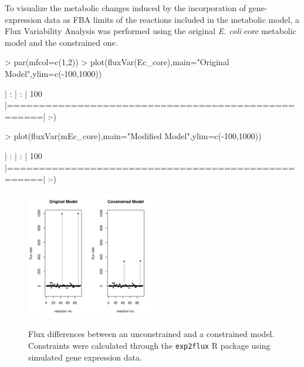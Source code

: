 To visualize the metabolic changes induced by the incorporation of gene-expression data as FBA limits of the reactions included in the metabolic model, a Flux Variability Analysis was performed using the original \textit{E. coli} core metabolic model and the constrained one.
\begin{Schunk}
\begin{Sinput}
> par(mfcol=c(1,2))
> plot(fluxVar(Ec_core),main="Original Model",ylim=c(-100,1000))
\end{Sinput}
\begin{Soutput}
|            :            |            :            | 100 %
|===================================================| :-) 
\end{Soutput}
\begin{Sinput}
> plot(fluxVar(mEc_core),main="Modified Model",ylim=c(-100,1000))
\end{Sinput}
\begin{Soutput}
|            :            |            :            | 100 %
|===================================================| :-) 
\end{Soutput}
\end{Schunk}
\begin{figure}[h]
\begin{center}
\includegraphics[width=0.5\textwidth]{exp2flux/exp2flux-001}\\
\caption{Flux differences between an unconstrained and a constrained model. Constraints were calculated through the \texttt{exp2flux} R package using simulated gene expression data.}
\label{exp2fluxFlux}
\end{center}
\end{figure}
